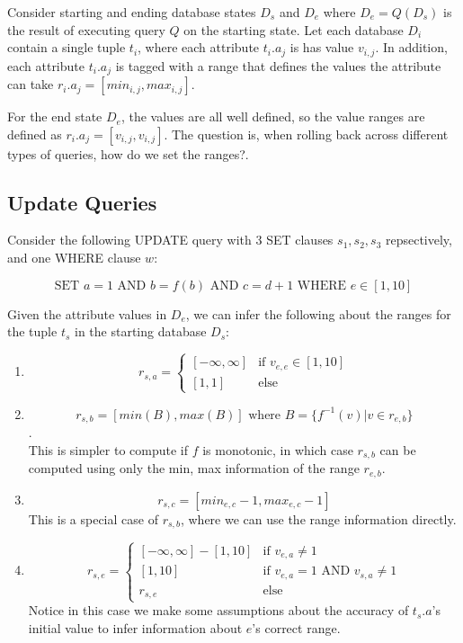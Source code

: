\documentclass{article}
\begin{document}
Consider starting and ending database states $D_s$ and $D_e$ where
$D_e = Q(D_s)$ is the result of executing query $Q$ on the starting
state.  Let each database $D_i$ contain a single tuple $t_i$, where
each attribute $t_i.a_j$ is has value $v_{i,j}$.  In addition, each
attribute $t_i.a_j$ is tagged with a range that defines the values
the attribute can take $r_i.a_j = [min_{i,j}, max_{i,j}]$.

For the end state $D_e$, the values are all well defined, so the value ranges are
defined as $r_i.a_j = [v_{i,j}, v_{i,j}]$.  The question is, when rolling back
across different types of queries, how do we set the ranges?.

\subsection{Update Queries}

Consider the following UPDATE query with 3 SET clauses $s_1, s_2, s_3$ repsectively,
and one WHERE clause $w$:

\[
\text{SET } a=1 \text{ AND } b=f(b) \text{ AND } c=d+1 \text{ WHERE } e \in [1, 10] 
\]

Given the attribute values in $D_e$, we can infer the following
about the ranges for the tuple $t_s$ in the starting database $D_s$:

\begin{enumerate}
\item \[r_{s,a} = \begin{cases}
[-\infty, \infty] & \mbox{if } v_{e,e} \in [1, 10]\\
[1, 1]            & \text{else}
\end{cases}\]
\item $$r_{s,b} = [min(B), max(B)] \mbox{ where } B = \{ f^{-1}(v) | v \in r_{e,b} \}$$.\\
      This is simpler to compute if $f$ is monotonic, in which case $r_{s,b}$ can be computed 
      using only the min, max information of the range $r_{e,b}$.
\item $$r_{s,c} = [min_{e,c}-1, max_{e,c}-1]$$
      This is a special case of $r_{s,b}$, where we can use the range information directly.
\item \[r_{s,e} = \begin{cases}
[-\infty, \infty] - [1,10] & \mbox{if } v_{e,a} \ne 1\\
[1,10]                     & \mbox{if } v_{e,a} = 1 \mbox{ AND } v_{s,a} \ne 1\\
r_{s,e}                    & \mbox{else }
\end{cases}
\]
Notice in this case we make some assumptions about the accuracy of $t_s.a$'s initial value to infer
information about $e$'s correct range.
\end{enumerate}
\end{document}
